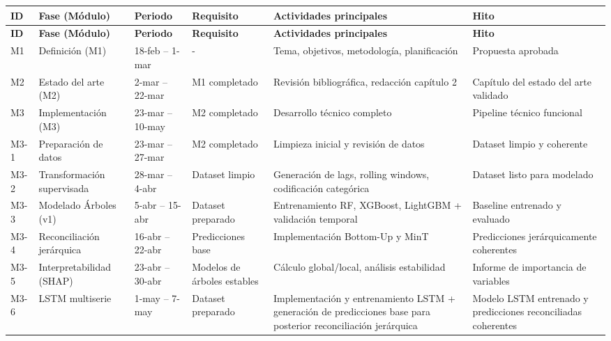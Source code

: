\documentclass[IB,BIB]{TFUOC}%
\begin{document}
\begin{longtable}{p{1cm} !{\vrule width 0.1pt} p{2.85cm} !{\vrule width 0.1pt} p{1.7cm} !{\vrule width 0.1pt} p{2cm} !{\vrule width 0.1pt} p{4.5cm} !{\vrule width 0.1pt} p{4cm}}

\toprule
\toprule
\textbf{ID} & \textbf{Fase (Módulo)} & \textbf{Periodo} & \textbf{Requisito} & \textbf{Actividades principales} & \textbf{Hito} \\
\midrule
\midrule
\endfirsthead

\toprule
\toprule
\textbf{ID} & \textbf{Fase (Módulo)} & \textbf{Periodo} & \textbf{Requisito} & \textbf{Actividades principales} & \textbf{Hito} \\
\midrule
\midrule
\endhead

M1 & Definición (M1) & 18-feb -- 1-mar & - & Tema, objetivos, metodología, planificación & Propuesta aprobada \\
\midrule
\midrule
M2 & Estado del arte (M2) & 2-mar -- 22-mar & M1 completado & Revisión bibliográfica, redacción capítulo 2 & Capítulo del estado del arte validado \\
\midrule
\midrule
M3 & Implementación (M3) & 23-mar -- 10-may & M2 completado & Desarrollo técnico completo & Pipeline técnico funcional \\
\midrule
M3-1 & Preparación de datos & 23-mar -- 27-mar & M2 completado & Limpieza inicial y revisión de datos & Dataset limpio y coherente \\
\midrule
M3-2 & Transformación supervisada & 28-mar -- 4-abr & Dataset limpio & Generación de lags, rolling windows, codificación categórica & Dataset listo para modelado \\
\midrule
M3-3 & Modelado Árboles (v1) & 5-abr -- 15-abr & Dataset preparado & Entrenamiento RF, XGBoost, LightGBM + validación temporal & Baseline entrenado y evaluado \\
\midrule
M3-4 & Reconciliación jerárquica & 16-abr -- 22-abr & Predicciones base & Implementación Bottom-Up y MinT & Predicciones jerárquicamente coherentes \\
\midrule
M3-5 & Interpretabilidad (SHAP) & 23-abr -- 30-abr & Modelos de árboles estables & Cálculo global/local, análisis estabilidad & Informe de importancia de variables \\
\midrule
M3-6 & LSTM multiserie & 1-may -- 7-may & Dataset preparado & Implementación y entrenamiento LSTM + generación de predicciones base para posterior reconciliación jerárquica & Modelo LSTM entrenado y predicciones reconciliadas coherentes \\

\end{longtable}
\end{document}
